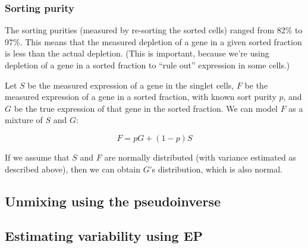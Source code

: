\documentclass{article}
\begin{document}
\subsubsection*{Sorting purity}

The sorting purities (measured by re-sorting the sorted cells) ranged from 82\% to 97\%.
This means that the measured depletion of a gene in a given sorted fraction is less than
the actual depletion. (This is important, because we're using depletion of a gene in a
sorted fraction to ``rule out'' expression in some cells.)

Let $S$ be the measured expression of a gene in the singlet cells,
$F$ be the
measured expression of a gene in a sorted fraction, with known sort purity $p$, and
$G$ be the true expression of that gene in the sorted fraction.
We can model $F$ as a mixture of $S$ and $G$:

\[
F = pG + (1-p)S
\]

If we assume that $S$ and $F$ are normally distributed (with variance estimated as described
above), then we can obtain $G$'s distribution, which is also normal.

\subsection*{Unmixing using the pseudoinverse}





\subsection*{Estimating variability using EP}
\end{document}
